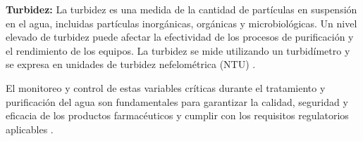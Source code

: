 \textbf{Turbidez:} La turbidez es una medida de la cantidad de partículas en suspensión en el agua, 
incluidas partículas inorgánicas, orgánicas y microbiológicas. Un nivel elevado de turbidez puede afectar 
la efectividad de los procesos de purificación y el rendimiento de los equipos. La turbidez se mide utilizando
 un turbidímetro y se expresa en unidades de turbidez nefelométrica (NTU) \cite{oceanebidaultQueFactoresDeterminan}.

El monitoreo y control de estas variables críticas durante el tratamiento y purificación del agua son fundamentales para garantizar la calidad, seguridad y eficacia de los productos farmacéuticos y cumplir con los requisitos regulatorios aplicables .
